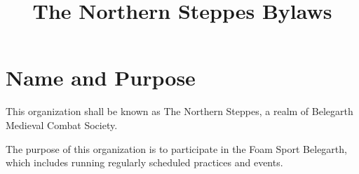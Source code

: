 \documentclass[12pt]{article}
\title{The Northern Steppes Bylaws}
\begin{document}

\maketitle



\section{Name and Purpose}
\begin{level}
    \item This organization shall be known as The Northern Steppes, a realm of Belegarth Medieval Combat Society.
    \item The purpose of this organization is to participate in the Foam Sport Belegarth, which includes running regularly scheduled practices and events.
\end{level}
\end{document}
